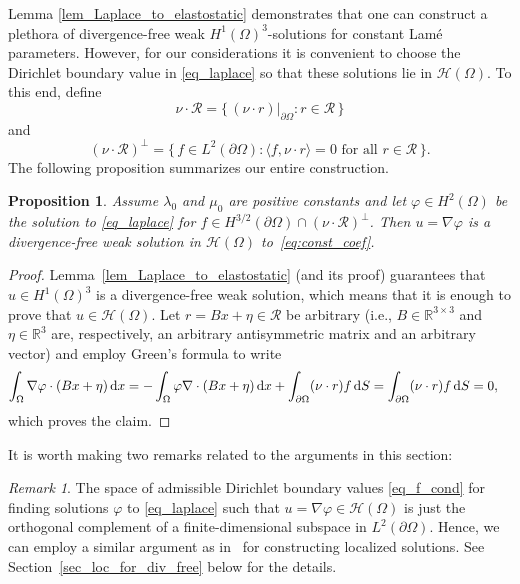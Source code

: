 \documentclass[reqno]{amsart}
\numberwithin{equation}{section}
\numberwithin{figure}{section}
\numberwithin{table}{section}
\newcommand{\inner}[1]{\langle#1\rangle}
\newcommand{\di}{\mathrm{d}}
\newcommand{\R}{\mathbb{R}}
\theoremstyle{definition}
\theoremstyle{plain}
\newtheorem{prop}[thm]{Proposition}
\theoremstyle{definition}
\theoremstyle{remark}
\newtheorem{rem}[thm]{Remark}
\numberwithin{equation}{section}
\begin{document}
Lemma \ref{lem_Laplace_to_elastostatic} demonstrates that one can construct a plethora of divergence-free weak $H^1(\Omega)^3$-solutions for constant Lam\'e parameters. However, for our considerations it is convenient to choose the Dirichlet boundary value in \eqref{eq_laplace} so that these solutions lie in $\mathcal{H}(\Omega)$. To this end, define
%
\begin{equation*} 
	\nu \cdot \mathcal{R} =  \{\, (\nu \cdot r)|_{\partial\Omega}  : r \in \mathcal R \,\}
\end{equation*}
%
and 
%
\begin{equation} \label{eq_f_cond}
    (\nu \cdot \mathcal{R})^\perp =  \{ \, f \in L^2(\partial \Omega)  :  \inner{f, \nu \cdot r} = 0 \text{ for all } r \in \mathcal{R} \, \}.
\end{equation}
%
The following proposition summarizes our entire construction.

\begin{prop} \label{prop_Laplace_to_elastostatic}
	Assume $\lambda_0$ and $\mu_0$ are positive constants and let $\varphi \in H^2(\Omega)$ be the solution to \eqref{eq_laplace} for $f \in H^{3/2}(\partial \Omega) \cap (\nu \cdot \mathcal{R})^\perp$. Then $u = \nabla \varphi$ is a divergence-free weak solution in $\mathcal{H}(\Omega)$ to~\eqref{eq:const_coef}.
\end{prop}

\begin{proof}
	Lemma~\ref{lem_Laplace_to_elastostatic} (and its proof) guarantees that $u \in H^1(\Omega)^3$ is a divergence-free weak solution, which means that it is enough to prove that $u \in \mathcal{H}(\Omega)$. Let $r = Bx + \eta \in \mathcal R$ be arbitrary (i.e., $B \in \R^{3 \times 3}$ and $\eta \in \R^3$ are, respectively, an arbitrary antisymmetric matrix and an arbitrary vector) and employ Green's formula to write
	\begin{align*}
		\int_\Omega \nabla \varphi \cdot (Bx + \eta) \,{\rm d} x  & = -\int_\Omega \varphi \nabla \cdot (Bx + \eta) \,\di x + \int_{\partial\Omega} (\nu \cdot r) f \, {\rm d} S = \int_{\partial\Omega} (\nu \cdot r) f\,\di S = 0, 
	\end{align*}
	which proves the claim.
\end{proof}

It is worth making two remarks related to the arguments in this section:

\begin{rem}
	The space of admissible Dirichlet boundary values \eqref{eq_f_cond} for finding solutions $\varphi$ to \eqref{eq_laplace} such that $u = \nabla \varphi \in \mathcal{H}(\Omega)$ is just the orthogonal complement of a finite-dimensional subspace in $L^2(\partial \Omega)$. Hence, we can employ a similar argument as in~\cite{HPS19b} for constructing localized solutions. See Section~\ref{sec_loc_for_div_free} below for the details. 
\end{rem}
\end{document}
